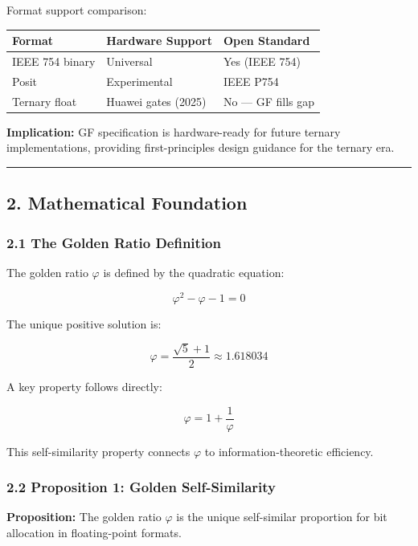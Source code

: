 Format support comparison:

{\def\LTcaptype{none} %
\begin{longtable}[]{@{}lll@{}}
\toprule\noalign{}
Format & Hardware Support & Open Standard \\
\midrule\noalign{}
\endhead
\bottomrule\noalign{}
\endlastfoot
IEEE 754 binary & Universal & Yes (IEEE 754) \\
Posit & Experimental & IEEE P754 \\
Ternary float & Huawei gates (2025) & No --- GF fills gap \\
\end{longtable}
}

\textbf{Implication:} GF specification is hardware-ready for future
ternary implementations, providing first-principles design guidance for
the ternary era.

\begin{center}\rule{0.5\linewidth}{0.5pt}\end{center}

\subsection{2. Mathematical Foundation}\label{mathematical-foundation}

\subsubsection{2.1 The Golden Ratio
Definition}\label{the-golden-ratio-definition}

The golden ratio \(\varphi\) is defined by the quadratic equation:

\[\varphi^2 - \varphi - 1 = 0\]

The unique positive solution is:

\[\varphi = \frac{\sqrt{5} + 1}{2} \approx 1.618034\]

A key property follows directly:

\[\varphi = 1 + \frac{1}{\varphi}\]

This self-similarity property connects \(\varphi\) to
information-theoretic efficiency.

\subsubsection{2.2 Proposition 1: Golden
Self-Similarity}\label{proposition-1-golden-self-similarity}

\textbf{Proposition:} The golden ratio \(\varphi\) is the unique
self-similar proportion for bit allocation in floating-point formats.

